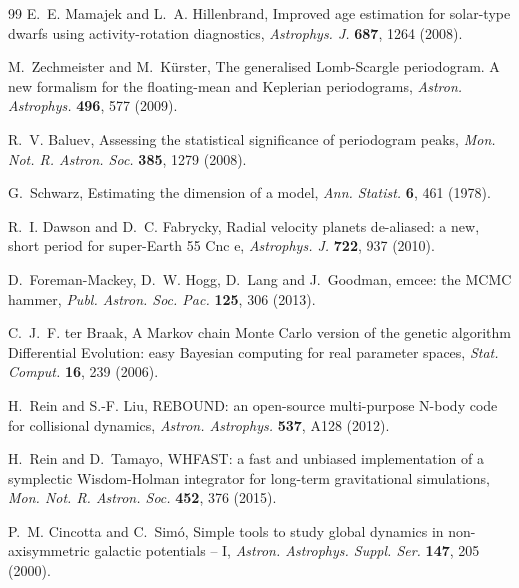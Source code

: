 \documentclass[3p,11pt]{elsarticle}
\begin{document}
\begin{thebibliography}{99}
E.~E. Mamajek and L.~A. Hillenbrand, Improved age estimation for solar-type dwarfs using
activity-rotation diagnostics, \emph{Astrophys. J.} \textbf{687}, 1264 (2008).

M.~Zechmeister and M.~K\"urster, The generalised Lomb-Scargle periodogram. A new formalism for the
floating-mean and Keplerian periodograms, \emph{Astron. Astrophys.} \textbf{496}, 577 (2009).

R.~V. Baluev, Assessing the statistical significance of periodogram peaks, \emph{Mon. Not. R. Astron.
Soc.} \textbf{385}, 1279 (2008).

G.~Schwarz, Estimating the dimension of a model, \emph{Ann. Statist.} \textbf{6}, 461 (1978).

R.~I. Dawson and D.~C. Fabrycky, Radial velocity planets de-aliased: a new, short period for super-Earth
55 Cnc e, \emph{Astrophys. J.} \textbf{722}, 937 (2010).

D.~Foreman-Mackey, D.~W. Hogg, D.~Lang and J.~Goodman, emcee: the MCMC hammer, \emph{Publ. Astron. Soc.
Pac.} \textbf{125}, 306 (2013).

C.~J.~F. ter Braak, A Markov chain Monte Carlo version of the genetic algorithm Differential Evolution:
easy Bayesian computing for real parameter spaces, \emph{Stat. Comput.} \textbf{16}, 239 (2006).

H.~Rein and S.-F. Liu, REBOUND: an open-source multi-purpose N-body code for collisional dynamics,
\emph{Astron. Astrophys.} \textbf{537}, A128 (2012).

H.~Rein and D.~Tamayo, WHFAST: a fast and unbiased implementation of a symplectic Wisdom-Holman
integrator for long-term gravitational simulations, \emph{Mon. Not. R. Astron. Soc.} \textbf{452}, 376
(2015).

P.~M. Cincotta and C.~Sim\'o, Simple tools to study global dynamics in non-axisymmetric galactic
potentials -- I, \emph{Astron. Astrophys. Suppl. Ser.} \textbf{147}, 205 (2000).

\end{thebibliography}
\end{document}
